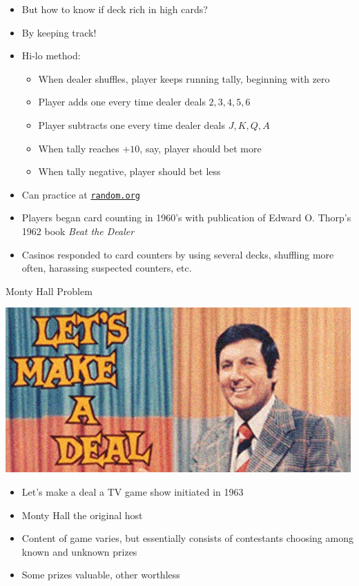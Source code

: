 \documentclass[handout]{beamer}
\theoremstyle{definition}
\begin{document}
\begin{frame}
\begin{itemize}
\item But how to know if deck rich in high cards?
\item By keeping track!
\item Hi-lo method:
\begin{itemize}
\item When dealer shuffles, player keeps running tally,
beginning with zero
\item Player adds one every time dealer deals $2,3,4,5,6$
\item Player subtracts one every time dealer deals $J,K,Q,A$
\item When tally reaches $+10$, say, player should bet more
\item When tally negative, player should bet less
\end{itemize}
\item Can practice at \href{http://www.random.org/playing-cards}
{\color{blue}\tt random.org}
\item Players began card counting in 1960's with publication
of Edward O. Thorp's 1962 book {\em Beat the Dealer}
\item Casinos responded to card counters by using several decks,
shuffling more often, harassing suspected counters, etc.
\end{itemize}
\end{frame}

\begin{frame}{Monty Hall Problem}
\begin{center}\includegraphics[scale=.5]{LetsMakeDeal}\end{center}
\begin{itemize}
\item \alert{Let's make a deal} a TV game show
initiated in 1963
\item Monty Hall the original host
\item Content of game varies, but essentially
consists of contestants choosing among known and unknown prizes
\item Some prizes valuable, other worthless
\end{itemize}
\end{frame}
\end{document}

